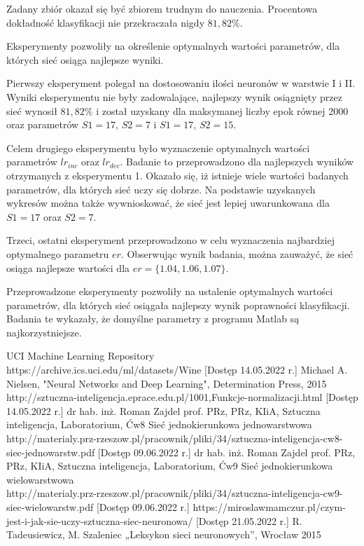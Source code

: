 \documentclass[12pt,twoside]{article}
\begin{document}
Zadany zbiór okazał się być zbiorem trudnym do nauczenia. Procentowa dokładność klasyfikacji nie przekraczała nigdy $81,82\%$. 

Eksperymenty pozwoliły na określenie optymalnych wartości parametrów, dla których sieć osiąga najlepsze wyniki. 

Pierwszy eksperyment polegał na dostosowaniu ilości neuronów w warstwie I i II. Wyniki eksperymentu nie były zadowalające, najlepszy wynik osiągnięty przez sieć wynosił $81,82\%$ i został uzyskany dla maksymanej liczby epok równej 2000 oraz parametrów $S1=17$, $S2=7$ i $S1=17$, $S2=15$. 

Celem drugiego eksperymentu było wyznaczenie optymalnych wartości parametrów $lr_{inc}$ oraz $lr_{dec}$. Badanie to przeprowadzono dla najlepszych wyników otrzymanych z eksperymentu 1. Okazało się, iż istnieje wiele wartości badanych parametrów, dla których sieć uczy się dobrze. Na podstawie uzyskanych wykresów można także wywnioskować, że sieć jest lepiej uwarunkowana dla $S1 = 17$ oraz $S2 = 7$.

Trzeci, ostatni eksperyment przeprowadzono w celu wyznaczenia najbardziej optymalnego parametru $er$. Obserwując wynik badania, można zauważyć, że sieć osiąga najlepsze wartości dla $er = \{1.04, 1.06, 1.07\}$. 

Przeprowadzone eksperymenty pozwoliły na ustalenie optymalnych wartości parametrów, dla których sieć osiągała najlepszy wynik poprawności klasyfikacji. Badania te wykazały, że domyślne parametry z programu Matlab są najkorzystniejsze. 

\clearpage



\begin{thebibliography}{4}
 UCI Machine Learning Repository\\https://archive.ics.uci.edu/ml/datasets/Wine [Dostęp 14.05.2022 r.]
 Michael A. Nielsen, "Neural Networks and Deep Learning", Determination Press, 2015
 http://sztuczna-inteligencja.eprace.edu.pl/1001,Funkcje-normalizacji.html [Dostęp 14.05.2022 r.]
dr hab. inż. Roman Zajdel prof. PRz, PRz, KIiA, Sztuczna inteligencja, Laboratorium, Ćw8 Sieć jednokierunkowa jednowarstwowa\\
http://materialy.prz-rzeszow.pl/pracownik/pliki/34/sztuczna-inteligencja-cw8-siec-jednowarstw.pdf [Dostęp 09.06.2022 r.]
dr hab. inż. Roman Zajdel prof. PRz, PRz, KIiA, Sztuczna inteligencja, Laboratorium, Ćw9 Sieć jednokierunkowa wielowarstwowa\\
http://materialy.prz-rzeszow.pl/pracownik/pliki/34/sztuczna-inteligencja-cw9-siec-wielowarstw.pdf [Dostęp 09.06.2022 r.]
https://miroslawmamczur.pl/czym-jest-i-jak-sie-uczy-sztuczna-siec-neuronowa/ [Dostęp 21.05.2022 r.]
 R. Tadeusiewicz, M. Szaleniec „Leksykon sieci neuronowych”, Wrocław 2015


\end{thebibliography}

\clearpage
\end{document}
